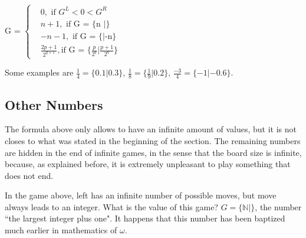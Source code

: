 G = 
$
\begin{cases}
	&0, \text{ if $G^L < 0 < G^R$}\\
	&n+1, \text{ if G = \{n $|$\}}\\
	&-n-1, \text{ if G = \{$|$-n\}}\\
	&\frac{2p + 1}{2^{q+1}}, \text{if G = $\{\frac{p}{2^q} | \frac{p+1}{2^q}\}$}
\end{cases}
$

\vspace{0.6em}Some examples are $\frac{1}{4} = \{0.1 | 0.3\}$, $\frac{1}{8} = \{\frac{1}{9} | 0.2\}$, $\frac{-3}{4} = \{-1 | -0.6\}$.

\subsection*{Other Numbers}

The formula above only allows \Gm{} to have an infinite amount of values, but it is not closes to what was stated in the beginning of the section. The remaining numbers are hidden in the end of infinite games, in the sense that the board size is infinite, because, as explained before, it is extremely unpleasant to play something that does not end. 



In the game above, left has an infinite number of possible moves, but  move always leads to an integer. What is the value of this game? $G = \{\mathbb{N} | \}$, the number ``the largest integer plus one". It happens that this number has been baptized much earlier in mathematics of $\omega$.













